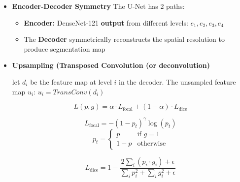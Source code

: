 \documentclass[../main.tex]{subfiles}
\begin{document}
\begin{itemize}
    \item \textbf{Encoder-Decoder Symmetry}
    The U-Net has $2$ paths:
    \begin{itemize}
        \item  \textbf{Encoder:} DenseNet-121 \textbf{output} from different levels: $e_1, e_2, e_3, e_4$
        \item The \textbf{Decoder} symmetrically reconstructs the spatial resolution to produce segmentation map
    \end{itemize}

    \item \textbf{Upsampling (Transposed Convolution (or deconvolution)}

    let $d_i$ be the feature map at level $i$ in the decoder. The unsampled feature map $u_i$: $u_i = TransConv(d_i)$

\begin{equation}
    L(p, g) = \alpha \cdot L_{\text{focal}} + (1 - \alpha) \cdot L_{\text{dice}}
\end{equation}

\begin{equation}
    L_{\text{focal}} = - (1 - p_t)^\gamma \log(p_t)
\end{equation}
\[
p_t =
\begin{cases}
    p & \text{if } g = 1 \\
    1 - p & \text{otherwise}
\end{cases}
\]

\begin{equation}
    L_{\text{dice}} = 1 - \frac{2 \sum_{i} (p_i \cdot g_i) + \epsilon}{\sum_{i} p_i^2 + \sum_{i} g_i^2 + \epsilon}
\end{equation}
    
\end{itemize}
\end{document}
